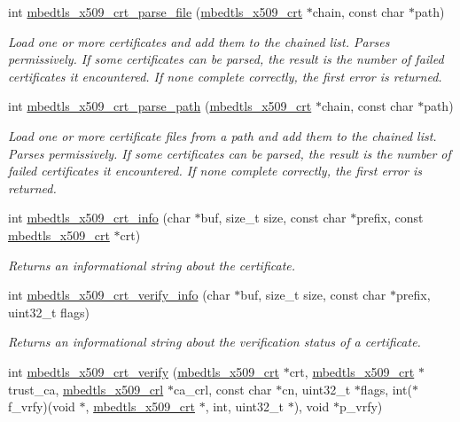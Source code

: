 \begin{DoxyCompactItemize}
int \hyperlink{group__x509__module_gad4da63133d3590aa311488497d4c38ec}{mbedtls\-\_\-x509\-\_\-crt\-\_\-parse\-\_\-file} (\hyperlink{structmbedtls__x509__crt}{mbedtls\-\_\-x509\-\_\-crt} $\ast$chain, const char $\ast$path)
\begin{DoxyCompactList}\small\item\em Load one or more certificates and add them to the chained list. Parses permissively. If some certificates can be parsed, the result is the number of failed certificates it encountered. If none complete correctly, the first error is returned. \end{DoxyCompactList}\item 
int \hyperlink{group__x509__module_ga571fc89b9f3217ab3dd67bd7af905066}{mbedtls\-\_\-x509\-\_\-crt\-\_\-parse\-\_\-path} (\hyperlink{structmbedtls__x509__crt}{mbedtls\-\_\-x509\-\_\-crt} $\ast$chain, const char $\ast$path)
\begin{DoxyCompactList}\small\item\em Load one or more certificate files from a path and add them to the chained list. Parses permissively. If some certificates can be parsed, the result is the number of failed certificates it encountered. If none complete correctly, the first error is returned. \end{DoxyCompactList}\item 
int \hyperlink{group__x509__module_gabaf30f2269fc3b6608b25871f9d09da6}{mbedtls\-\_\-x509\-\_\-crt\-\_\-info} (char $\ast$buf, size\-\_\-t size, const char $\ast$prefix, const \hyperlink{structmbedtls__x509__crt}{mbedtls\-\_\-x509\-\_\-crt} $\ast$crt)
\begin{DoxyCompactList}\small\item\em Returns an informational string about the certificate. \end{DoxyCompactList}\item 
int \hyperlink{group__x509__module_gae88f1d8e6696eb2beeffe0a708219e6b}{mbedtls\-\_\-x509\-\_\-crt\-\_\-verify\-\_\-info} (char $\ast$buf, size\-\_\-t size, const char $\ast$prefix, uint32\-\_\-t flags)
\begin{DoxyCompactList}\small\item\em Returns an informational string about the verification status of a certificate. \end{DoxyCompactList}\item 
int \hyperlink{group__x509__module_ga98ed4504e4f832b735a230acf54fcde3}{mbedtls\-\_\-x509\-\_\-crt\-\_\-verify} (\hyperlink{structmbedtls__x509__crt}{mbedtls\-\_\-x509\-\_\-crt} $\ast$crt, \hyperlink{structmbedtls__x509__crt}{mbedtls\-\_\-x509\-\_\-crt} $\ast$trust\-\_\-ca, \hyperlink{structmbedtls__x509__crl}{mbedtls\-\_\-x509\-\_\-crl} $\ast$ca\-\_\-crl, const char $\ast$cn, uint32\-\_\-t $\ast$flags, int($\ast$f\-\_\-vrfy)(void $\ast$, \hyperlink{structmbedtls__x509__crt}{mbedtls\-\_\-x509\-\_\-crt} $\ast$, int, uint32\-\_\-t $\ast$), void $\ast$p\-\_\-vrfy)

\end{DoxyCompactItemize}
